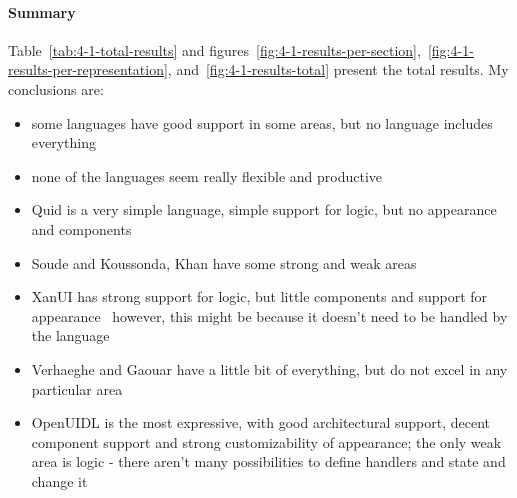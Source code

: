\paragraph{Summary}

Table~\ref{tab:4-1-total-results} and figures~\ref{fig:4-1-results-per-section},~\ref{fig:4-1-results-per-representation}, and~\ref{fig:4-1-results-total} present the total results.
My conclusions are:
\begin{itemize}
    \item some languages have good support in some areas, but no language includes everything
    \item none of the languages seem really flexible and productive
    \item Quid is a very simple language, simple support for logic, but no appearance and components
    \item Soude and Koussonda, Khan have some strong and weak areas
    \item XanUI has strong support for logic, but little components and support for appearance \textendash\ however, this might be because it doesn't need to be handled by the language
    \item Verhaeghe and Gaouar have a little bit of everything, but do not excel in any particular area
    \item OpenUIDL is the most expressive, with good architectural support, decent component support and strong customizability of appearance; the only weak area is logic - there aren't many possibilities to define handlers and state and change it
\end{itemize}

